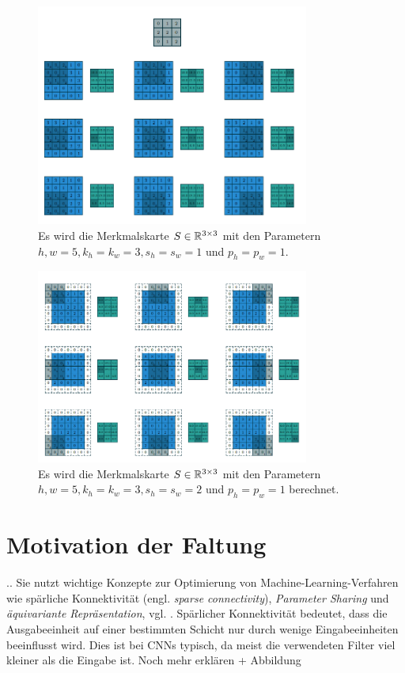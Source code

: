 \begin{figure}[h]
    \includegraphics[width=0.8\textwidth]{pics/abb_simpleconv}
    \centering
    \caption{Es wird die Merkmalskarte $S \in \mathbb{R}^{3 \times 3}$ mit den Parametern ${h,w=5}, k_h=k_w=3, s_h=s_w=1$ und $p_h=p_w=1.$}
    \label{abb_simplematrixconv}
\end{figure}

\begin{figure}[h]
    \includegraphics[width=0.8\textwidth]{pics/abb_simplecov_padding}
    \centering
    \caption{Es wird die Merkmalskarte $S \in \mathbb{R}^{3 \times 3}$ mit den Parametern ${h,w=5}, k_h=k_w=3, s_h=s_w=2$ und $p_h=p_w=1$ berechnet.}
    \label{abb_simplematrixconv_padding}
\end{figure}



\section{Motivation der Faltung}
..
Sie nutzt wichtige Konzepte zur Optimierung von Machine-Learning-Verfahren wie spärliche Konnektivität (engl. \textit{sparse connectivity}), \textit{Parameter Sharing} und \textit{äquivariante Repräsentation}, vgl. \cite{goodfellow}. Spärlicher Konnektivität bedeutet, dass die Ausgabeeinheit auf einer bestimmten Schicht nur durch wenige Eingabeeinheiten beeinflusst wird. Dies ist bei CNNs typisch, da meist die verwendeten Filter viel kleiner als die Eingabe ist. Noch mehr erklären + Abbildung


